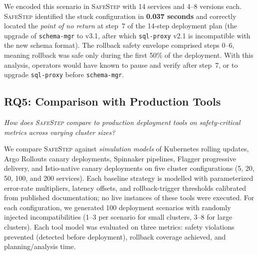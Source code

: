 \documentclass[10pt,twocolumn]{article}
\newcommand{\safestep}{\textsc{SafeStep}}
\begin{document}
We encoded this scenario in \safestep{} with 14 services
and 4--8 versions each. \safestep{} identified the stuck
configuration in \textbf{0.037 seconds} and correctly located
the \emph{point of no return} at step~7 of the 14-step
deployment plan (the upgrade of \texttt{schema-mgr} to v3.1,
after which \texttt{sql-proxy} v2.1 is incompatible with the
new schema format). The rollback safety envelope comprised
steps 0--6, meaning rollback was safe only during the first
50\% of the deployment. With this analysis, operators would
have known to pause and verify after step~7, or to upgrade
\texttt{sql-proxy} before \texttt{schema-mgr}.

\subsection{RQ5: Comparison with Production Tools}

\emph{How does \safestep{} compare to production deployment
tools on safety-critical metrics across varying cluster sizes?}

We compare \safestep{} against \emph{simulation models} of
Kubernetes rolling updates,
Argo Rollouts canary deployments, Spinnaker pipelines,
Flagger progressive delivery, and Istio-native canary
deployments on five cluster configurations (5, 20, 50, 100,
and 200 services). Each baseline strategy is modelled with
parameterized error-rate multipliers, latency offsets, and
rollback-trigger thresholds calibrated from published
documentation; no live instances of these tools were
executed.
For each configuration, we generated 100
deployment scenarios with randomly injected incompatibilities
(1--3 per scenario for small clusters, 3--8 for large
clusters). Each tool model was evaluated on three metrics: safety
violations prevented (detected before deployment), rollback
coverage achieved, and planning/analysis time.
\end{document}
